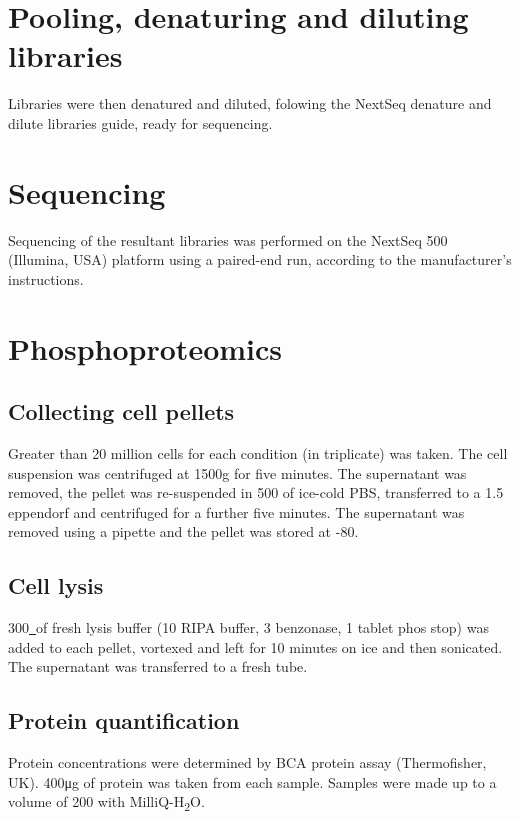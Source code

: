 
\section{Pooling, denaturing and diluting libraries}
Libraries were then denatured and diluted, folowing the NextSeq denature and dilute libraries guide, ready for sequencing.


\section{Sequencing}
Sequencing of the resultant libraries was performed on the NextSeq 500 (Illumina, USA) platform using a paired-end run, according to the manufacturer's instructions.

%
\section{Phosphoproteomics}\label{sec:methods-phospho}
%
\subsection{Collecting cell pellets}
Greater than 20 million cells for each condition (in triplicate) was taken.
The cell suspension was centrifuged at 1500g for five minutes.
The supernatant was removed, the pellet was re-suspended in 500\ul{} of ice-cold PBS, transferred to a 1.5\ml{} eppendorf and centrifuged for a further five minutes.
The supernatant was removed using a pipette and the pellet was stored at -80\C{}.

\subsection{Cell lysis}
300\ul\ of fresh lysis buffer (10\ml{} RIPA buffer, 3\ul{} benzonase, 1 tablet phos stop) was added to each pellet, vortexed and left for 10 minutes on ice and then sonicated.
The supernatant was transferred to a fresh tube.

\subsection{Protein quantification}
Protein concentrations were determined by BCA protein assay (Thermofisher, UK). 400\si{\ug} of protein was taken from each sample. Samples were made up to a volume of 200\ul{} with MilliQ-H\textsubscript{2}O.

